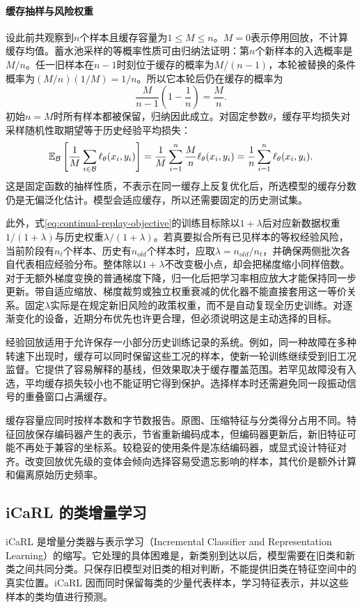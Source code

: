 \paragraph{缓存抽样与风险权重}
设此前共观察到$n$个样本且缓存容量为$1\leq M\leq n$。$M=0$表示停用回放，不计算缓存均值。蓄水池采样的等概率性质可由归纳法证明：第$n$个新样本的入选概率是$M/n$。任一旧样本在$n-1$时刻位于缓存的概率为$M/(n-1)$，本轮被替换的条件概率为$(M/n)(1/M)=1/n$。所以它本轮后仍在缓存的概率为
\begin{equation}
 \frac{M}{n-1}\left(1-\frac1n\right)=\frac Mn.
\end{equation}
初始$n=M$时所有样本都被保留，归纳因此成立。对固定参数$\theta$，缓存平均损失对采样随机性取期望等于历史经验平均损失：
\begin{equation}
 \mathbb{E}_{\mathcal B}\left[\frac1M\sum_{i\in\mathcal B}\ell_\theta(x_i,y_i)\right]
 =\frac1M\sum_{i=1}^n\frac Mn\ell_\theta(x_i,y_i)
 =\frac1n\sum_{i=1}^n\ell_\theta(x_i,y_i).
\end{equation}
这是固定函数的抽样性质，不表示在同一缓存上反复优化后，所选模型的缓存分数仍是无偏泛化估计。模型会适应缓存，所以还需要固定的历史测试集。

此外，式\eqref{eq:continual-replay-objective}的训练目标除以$1+\lambda$后对应新数据权重$1/(1+\lambda)$与历史权重$\lambda/(1+\lambda)$。若真要拟合所有已见样本的等权经验风险，当前阶段有$n_t$个样本、历史有$n_{old}$个样本时，应取$\lambda=n_{old}/n_t$，并确保两侧批次各自代表相应经验分布。整体除以$1+\lambda$不改变极小点，却会把梯度缩小同样倍数。对于无额外梯度变换的普通梯度下降，归一化后把学习率相应放大才能保持同一步更新。带自适应缩放、梯度裁剪或独立权重衰减的优化器不能直接套用这一等价关系。固定$\lambda$实际是在规定新旧风险的政策权重，而不是自动复现全历史训练。对逐渐变化的设备，近期分布优先也许更合理，但必须说明这是主动选择的目标。

经验回放适用于允许保存一小部分历史训练记录的系统。例如，同一种故障在多种转速下出现时，缓存可以同时保留这些工况的样本，使新一轮训练继续受到旧工况监督。它提供了容易解释的基线，但效果取决于缓存覆盖范围。若罕见故障没有入选，平均缓存损失较小也不能证明它得到保护。选择样本时还需避免同一段振动信号的重叠窗口占满缓存。

缓存容量应同时按样本数和字节数报告。原图、压缩特征与分类得分占用不同。特征回放保存编码器产生的表示，节省重新编码成本，但编码器更新后，新旧特征可能不再处于兼容的坐标系。较稳妥的使用条件是冻结编码器，或显式设计特征对齐。改变回放优先级的变体会倾向选择容易受遗忘影响的样本，其代价是额外计算和偏离原始历史频率。

\subsection{iCaRL 的类增量学习}
iCaRL 是增量分类器与表示学习（Incremental Classifier and Representation Learning）的缩写\cite{rebuffi2017icarl}。它处理的具体困难是，新类别到达以后，模型需要在旧类和新类之间共同分类。只保存旧模型对旧类的相对判断，不能提供旧类在特征空间中的真实位置。iCaRL 因而同时保留每类的少量代表样本，学习特征表示，并以这些样本的类均值进行预测。

